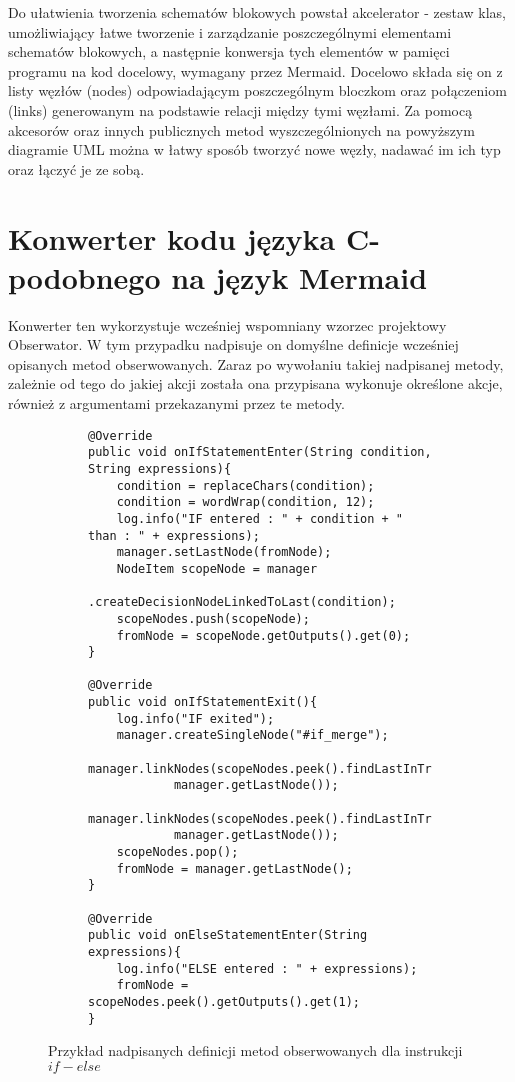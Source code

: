 	Do ułatwienia tworzenia schematów blokowych powstał akcelerator - zestaw klas, umożliwiający łatwe tworzenie i zarządzanie poszczególnymi elementami schematów blokowych, a następnie konwersja tych elementów w pamięci programu na kod docelowy, wymagany przez Mermaid. Docelowo składa się on z listy węzłów (nodes) odpowiadającym poszczególnym bloczkom oraz połączeniom (links) generowanym na podstawie relacji między tymi węzłami. 	Za pomocą akcesorów oraz innych publicznych metod wyszczególnionych na powyższym diagramie UML można w łatwy sposób tworzyć nowe węzły, nadawać im ich typ oraz łączyć je ze sobą.

\section{Konwerter kodu języka C-podobnego na język Mermaid}

	Konwerter ten wykorzystuje wcześniej wspomniany wzorzec projektowy Obserwator. W tym przypadku nadpisuje on domyślne definicje wcześniej opisanych metod obserwowanych. Zaraz po wywołaniu takiej nadpisanej metody, zależnie od tego do jakiej akcji została ona przypisana wykonuje określone akcje, również z argumentami przekazanymi przez te metody.
	
							
\begin{figure}[H]
  \begin{subfigure}{\textwidth}
		\begin{verbatim}
@Override
public void onIfStatementEnter(String condition, String expressions){
    condition = replaceChars(condition);
    condition = wordWrap(condition, 12);
    log.info("IF entered : " + condition + " than : " + expressions);
    manager.setLastNode(fromNode);
    NodeItem scopeNode = manager
            .createDecisionNodeLinkedToLast(condition);
    scopeNodes.push(scopeNode);
    fromNode = scopeNode.getOutputs().get(0);
}

@Override
public void onIfStatementExit(){
    log.info("IF exited");
    manager.createSingleNode("#if_merge");
    manager.linkNodes(scopeNodes.peek().findLastInTree(0), 
            manager.getLastNode());
    manager.linkNodes(scopeNodes.peek().findLastInTree(1), 
            manager.getLastNode());
    scopeNodes.pop();
    fromNode = manager.getLastNode();
}

@Override
public void onElseStatementEnter(String expressions){
    log.info("ELSE entered : " + expressions);
    fromNode = scopeNodes.peek().getOutputs().get(1);
}
		\end{verbatim}
  \end{subfigure}\hfill
  \caption{Przykład nadpisanych definicji metod obserwowanych dla instrukcji $if-else$}
\end{figure}

